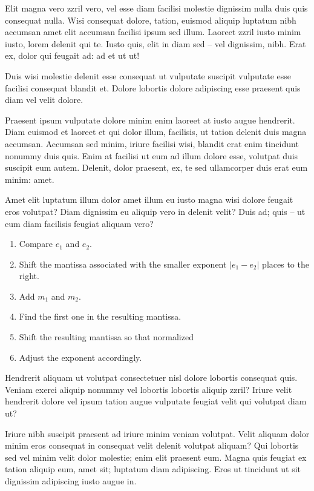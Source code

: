 Elit magna vero zzril vero, vel esse diam facilisi molestie dignissim nulla duis quis consequat nulla. Wisi consequat dolore, tation, euismod aliquip luptatum nibh accumsan amet elit accumsan facilisi ipsum sed illum. Laoreet zzril iusto minim iusto, lorem delenit qui te. Iusto quis, elit in diam sed -- vel dignissim, nibh. Erat ex, dolor qui feugait ad: ad et ut ut!

Duis wisi molestie delenit esse consequat ut vulputate suscipit vulputate esse facilisi consequat blandit et. Dolore lobortis dolore adipiscing esse praesent quis diam vel velit dolore.

Praesent ipsum vulputate dolore minim enim laoreet at iusto augue hendrerit. Diam euismod et laoreet et qui dolor illum, facilisis, ut tation delenit duis magna accumsan. Accumsan sed minim, iriure facilisi wisi, blandit erat enim tincidunt nonummy duis quis. Enim at facilisi ut eum ad illum dolore esse, volutpat duis suscipit eum autem. Delenit, dolor praesent, ex, te sed ullamcorper duis erat eum minim: amet.

Amet elit luptatum illum dolor amet illum eu iusto magna wisi dolore feugait eros volutpat? Diam dignissim eu aliquip vero in delenit velit? Duis ad; quis -- ut eum diam facilisis feugiat aliquam vero?

\begin{enumerate}
  \item Compare $e_1$ and $e_2$.
  \item Shift the mantissa associated with the smaller exponent $|e_1-e_2|$
        places to the right.
  \item Add $m_1$ and $m_2$.
  \item Find the first one in the resulting mantissa.
  \item Shift the resulting mantissa so that normalized
  \item Adjust the exponent accordingly.
\end{enumerate}

Hendrerit aliquam ut volutpat consectetuer nisl dolore lobortis consequat quis. Veniam exerci aliquip nonummy vel lobortis lobortis aliquip zzril? Iriure velit hendrerit dolore vel ipsum tation augue vulputate feugiat velit qui volutpat diam ut?

Iriure nibh suscipit praesent ad iriure minim veniam volutpat. Velit aliquam dolor minim eros consequat in consequat velit delenit volutpat aliquam? Qui lobortis sed vel minim velit dolor molestie; enim elit praesent eum. Magna quis feugiat ex tation aliquip eum, amet sit; luptatum diam adipiscing. Eros ut tincidunt ut sit dignissim adipiscing iusto augue in.


